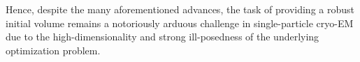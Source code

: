 Hence, despite the many aforementioned advances, the task of providing a robust initial volume remains a notoriously arduous challenge in single-particle cryo-EM due to the high-dimensionality and strong ill-posedness of the underlying optimization problem.

